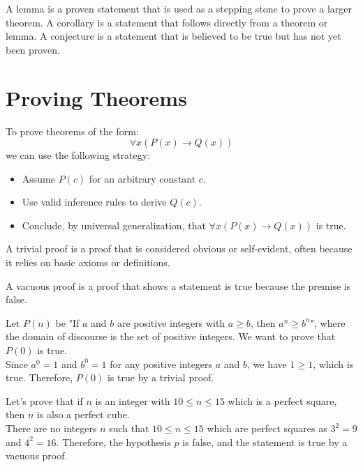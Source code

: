 \begin{definition}
    A lemma is a proven statement that is used as a stepping stone to prove a larger theorem. A corollary is a statement that follows directly from a theorem or lemma. A conjecture is a statement that is believed to be true but has not yet been proven.
\end{definition}

\section{Proving Theorems}
To prove theorems of the form:
\[
    \forall x (P(x) \to Q(x))
\]
we can use the following strategy:
\begin{itemize}[itemsep=1pt,label=$\circ$]
    \item Assume $P(c)$ for an arbitrary constant $c$.
    \item Use valid inference rules to derive $Q(c)$.
    \item Conclude, by universal generalization, that $\forall x (P(x) \to Q(x))$ is true.
\end{itemize}

\begin{definition}
    A trivial proof is a proof that is considered obvious or self-evident, often because it relies on basic axioms or definitions.
\end{definition}

\begin{definition}
    A vacuous proof is a proof that shows a statement is true because the premise is false.
\end{definition}

\begin{eg}
    Let $P(n)$ be "If $a$ and $b$ are positive integers with $a \geq b$, then $a^n \geq b^n$", where the domain of discourse is the set of positive integers. We want to prove that $P(0)$ is true. \\
    Since $a^0 = 1$ and $b^0 = 1$ for any positive integers $a$ and $b$, we have $1 \geq 1$, which is true. Therefore, $P(0)$ is true by a trivial proof.
\end{eg}

\begin{eg}
    Let's prove that if $n$ is an integer with $10 \leq n \leq 15$ which is a perfect square, then $n$ is also a perfect cube. \\
    There are no integers $n$ such that $10 \leq n \leq 15$ which are perfect squares as $3^2 = 9$ and $4^2 = 16$. Therefore, the hypothesis $p$ is false, and the statement is true by a vacuous proof.
\end{eg}

